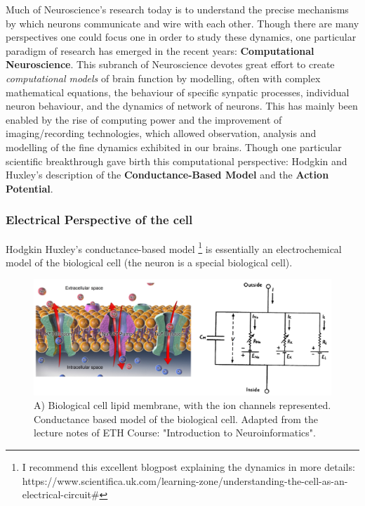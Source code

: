 Much of Neuroscience's research today is to understand the precise mechanisms by which neurons communicate and wire with each other. Though there are many perspectives one could focus one in order to study these dynamics, one particular paradigm of research has emerged in the recent years: \textbf{Computational Neuroscience}. This subranch of Neuroscience devotes great effort to create \textit{computational models} of brain function by modelling, often with complex mathematical equations, the behaviour of specific synpatic processes, individual neuron behaviour, and the dynamics of network of neurons. This has mainly been enabled by the rise of computing power and the improvement of imaging/recording technologies, which allowed observation, analysis and modelling of the fine dynamics exhibited in our brains. Though one particular scientific breakthrough gave birth this computational perspective: Hodgkin and Huxley's description of the \textbf{Conductance-Based Model} and the \textbf{Action Potential}.

\subsubsection{Electrical Perspective of the cell}

Hodgkin Huxley's conductance-based model \footnote{I recommend this excellent blogpost explaining the dynamics in more details: https://www.scientifica.uk.com/learning-zone/understanding-the-cell-as-an-electrical-circuit#} is essentially an electrochemical model of the biological cell (the neuron is a special biological cell). 

\begin{figure}
    \centering
    \includegraphics[width=\linewidth]{Figures/Conductance_Cell.PNG}
    \caption{A) Biological cell lipid membrane, with the ion channels represented. Conductance based model of the biological cell. Adapted from the lecture notes of ETH Course: "Introduction to Neuroinformatics".}
    \label{fig:Conductance_Cell}
\end{figure}

